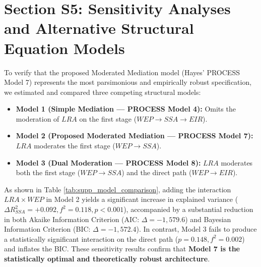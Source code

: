 \documentclass[11pt,a4paper]{article}
\begin{document}
\newpage
\section{Section S5: Sensitivity Analyses and Alternative Structural Equation Models}
\label{sec:supp_sensitivity}

To verify that the proposed Moderated Mediation model (Hayes' PROCESS Model 7) represents the most parsimonious and empirically robust specification, we estimated and compared three competing structural models:
\begin{itemize}
    \item \textbf{Model 1 (Simple Mediation --- PROCESS Model 4):} Omits the moderation of $LRA$ on the first stage ($WEP \rightarrow SSA \rightarrow EIR$).
    \item \textbf{Model 2 (Proposed Moderated Mediation --- PROCESS Model 7):} $LRA$ moderates the first stage ($WEP \rightarrow SSA$).
    \item \textbf{Model 3 (Dual Moderation --- PROCESS Model 8):} $LRA$ moderates both the first stage ($WEP \rightarrow SSA$) and the direct path ($WEP \rightarrow EIR$).
\end{itemize}

\begin{table}[htbp]
\centering
\small
\caption{Model Comparison and Sensitivity Metrics ($N = 10,000$)}
\label{tab:supp_model_comparison}
\end{table}

As shown in Table \ref{tab:supp_model_comparison}, adding the interaction $LRA \times WEP$ in Model 2 yields a significant increase in explained variance ($\Delta R^2_{SSA} = +0.092, f^2 = 0.118, p < 0.001$), accompanied by a substantial reduction in both Akaike Information Criterion (AIC: $\Delta = -1,579.6$) and Bayesian Information Criterion (BIC: $\Delta = -1,572.4$). In contrast, Model 3 fails to produce a statistically significant interaction on the direct path ($p = 0.148, f^2 = 0.002$) and inflates the BIC. These sensitivity results confirm that \textbf{Model 7 is the statistically optimal and theoretically robust architecture}.

\vspace{3ex}


\end{document}
